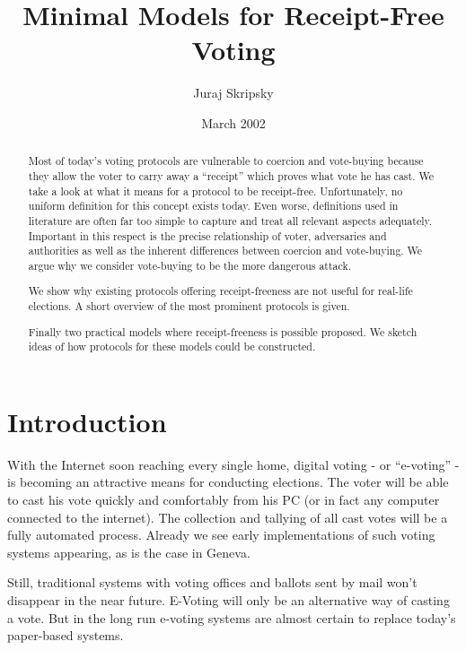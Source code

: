 \documentclass{article}
\title{\bf Minimal Models for Receipt-Free Voting}
\author{Juraj Skripsky}
\date{March 2002}
\begin{document}
\maketitle

\begin{abstract}
Most of today's voting protocols are vulnerable to coercion and vote-buying because they allow the voter to carry away a ``receipt'' which proves what vote he has cast. We take a look at what it means for a protocol to be receipt-free. Unfortunately, no uniform definition for this concept exists today. Even worse, definitions used in literature are often far too simple to capture and treat all relevant aspects adequately. Important in this respect is the precise relationship of voter, adversaries and authorities as well as the inherent differences between coercion and vote-buying. We argue why we consider vote-buying to be the more dangerous attack.

We show why existing protocols offering receipt-freeness are not useful for real-life elections. A short overview of the most prominent protocols is given.

Finally two practical models where receipt-freeness is possible proposed. We sketch ideas of how protocols for these models could be constructed.
\end{abstract}

\pagebreak


\tableofcontents

\pagebreak


\section{Introduction}
With the Internet soon reaching every single home, digital voting - or ``e-voting'' - is becoming an attractive means for conducting elections. The voter will be able to cast his vote quickly and comfortably from his PC (or in fact any computer connected to the internet). The collection and tallying of all cast votes will be a fully automated process. Already we see early implementations of such voting systems appearing, as is the case in Geneva.

Still, traditional systems with voting offices and ballots sent by mail won't disappear in the near future. E-Voting will only be an alternative way of casting a vote. But in the long run e-voting systems are almost certain to replace today's paper-based systems.
\end{document}
